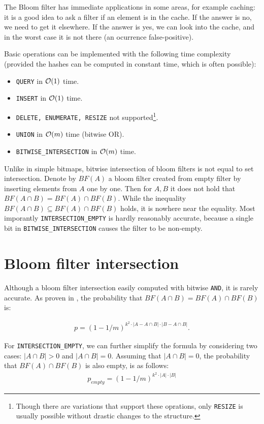 The Bloom filter has immediate applications in some areas, for example caching:
it is a good idea to ask a filter if an element is in the cache. If the answer is
no, we need to get it elsewhere. If the answer is yes, we can look into the
cache, and in the worst case it is not there (an ocurrence false-positive).

Basic operations can be implemented with the following time complexity (provided
the hashes can be computed in constant time, which is often possible):

\begin{itemize}
	\item {\tt QUERY} in $\mathcal{O}(1)$ time.
	\item {\tt INSERT} in $\mathcal{O}(1)$ time.
	\item {\tt DELETE, ENUMERATE, RESIZE} not supported\footnote{Though there
		are variations that support these oprations, only {\tt RESIZE} is usually
		possible without drastic changes to the structure.}.
	\item {\tt UNION} in $\mathcal{O}(m)$ time (bitwise OR).
	\item {\tt BITWISE\_INTERSECTION} in $\mathcal{O}(m)$ time.
\end{itemize}

Unlike in simple bitmaps, bitwise intersection of bloom filters is not equal to
set intersection.  Denote by $BF(A)$ a bloom filter created from empty
filter by inserting elements from $A$ one by one. Then for $A,B$ it does not
hold that $BF(A \cap B) = BF(A) \cap BF(B)$. While the inequality $BF(A \cap B)
\subseteq BF(A) \cap BF(B)$ holds, it is nowhere near the equality. Most
imporantly {\tt INTERSECTION\_EMPTY} is hardly reasonably accurate, because a
single bit in {\tt BITWISE\_INTERSECTION} causes the filter to be non-empty. 

\section{Bloom filter intersection}

Although a bloom filter intersection easily computed with bitwise {\tt AND},
it is rarely accurate. As proven in \cite{bose2008false}, the probability that
$BF(A\cap B) = BF(A) \cap BF(B)$ is:

\begin{align*}
	p = (1-1/m)^{k^2\cdot |A-A\cap B| \cdot |B - A\cap B|} \mathrm{.}
\end{align*}

\noindent For {\tt INTERSECTION\_EMPTY}, we can further simplify the formula by
considering two cases: $|A \cap B| > 0$ and $|A \cap B| = 0$. Assuming that
$|A\cap B| = 0$, the probability that $BF(A) \cap BF(B)$ is also empty, is as
follows:
\begin{align*}
	p_{empty} = (1-1/m)^{k^2 \cdot |A| \cdot |B|}
\end{align*}

